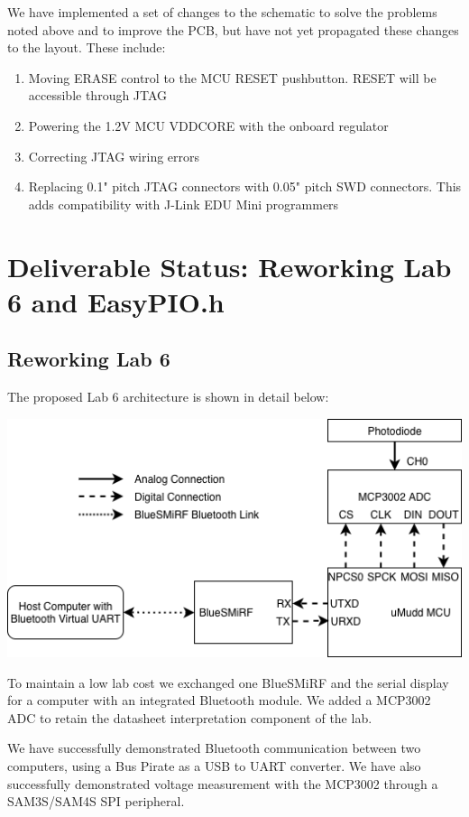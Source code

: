 \documentclass[12pt]{article}
\begin{document}
We have implemented a set of changes to the schematic to solve the problems noted above and to improve the PCB, but have not yet propagated these changes to the layout. These include:

\begin{enumerate}
	\item Moving ERASE control to the MCU RESET pushbutton. RESET will be accessible through JTAG
	\item Powering the 1.2V MCU VDDCORE with the onboard regulator
	\item Correcting JTAG wiring errors
	\item Replacing 0.1" pitch JTAG connectors with 0.05" pitch SWD connectors. This adds compatibility with J-Link EDU Mini programmers
\end{enumerate}

\newpage
\section{Deliverable Status: Reworking Lab 6 and EasyPIO.h}

\subsection{Reworking Lab 6}
The proposed Lab 6 architecture is shown in detail below:

\begin{center}
	\includegraphics[width=14cm]{blockdiagram.png}
\end{center}

To maintain a low lab cost we exchanged one BlueSMiRF and the serial display for a computer with an integrated Bluetooth module. We added a MCP3002 ADC to retain the datasheet interpretation component of the lab.

We have successfully demonstrated Bluetooth communication between two computers, using a Bus Pirate as a USB to UART converter. We have also successfully demonstrated voltage measurement with the MCP3002 through a SAM3S/SAM4S SPI peripheral.
\end{document}
